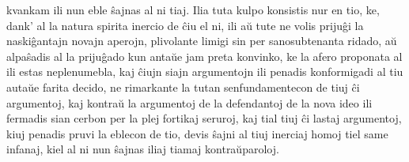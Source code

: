 kvankam ili nun eble \^sajnas al ni tiaj. Ilia tuta kulpo konsistis
nur en tio, ke, dank' al la natura spirita inercio de \^ciu el ni,
ili a\u u tute ne volis priju\^gi la naski\^gantajn novajn aperojn,
plivolante limigi sin per sanosubtenanta ridado, a\u u alpa\^sadis
al la priju\^gado kun anta\u ue jam preta konvinko, ke la afero
proponata al ili estas neplenumebla, kaj \^ciujn siajn argumentojn
ili penadis konformigadi al tiu auta\u ue farita decido, ne
rimarkante la tutan senfundamentecon de tiuj \^ci argumentoj, kaj
kontra\u u la argumentoj de la defendantoj de la nova ideo ili
fermadis sian cerbon per la plej fortikaj seruroj, kaj tial tiuj
\^ci lastaj argumentoj, kiuj penadis pruvi la eblecon de tio, devis
\^sajni al tiuj inerciaj homoj tiel same infanaj, kiel al ni nun
\^sajnas iliaj tiamaj kontra\u uparoloj.

